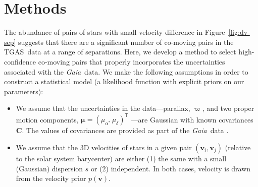 \documentclass[manuscript, letterpaper]{aastex6}
\newcommand{\project}[1]{\textsl{#1}}
\newcommand{\acronym}[1]{{\small{#1}}}
\newcommand{\gaia}{\project{Gaia}}
\newcommand{\figname}{Figure}
\newcommand{\tgas}{\acronym{TGAS}}
\newcommand{\transp}[1]{{#1}^{\!\mathsf{T}}}
\newcommand{\bs}[1]{\boldsymbol{#1}}
\newcommand{\propm}{\bs{\mu}}
\newcommand{\mat}[1]{\mathbf{#1}}
\renewcommand{\vec}[1]{\bs{#1}}
\begin{document}
\section{Methods} \label{sec:methods}

The abundance of pairs of stars with small velocity difference in
\figname~\ref{fig:dv-sep} suggests that there are a
significant number of co-moving pairs in the \tgas\ data at a range
of separations.
Here, we develop a method to select high-confidence co-moving
pairs that properly incorporates the uncertainties associated with the
\gaia\ data. We make the following assumptions in order to construct a
statistical model (a likelihood function with explicit priors on our
parameters):
\begin{itemize}
  \item We assume that the uncertainties in the data---parallax, $\varpi$, and
    two proper motion components, $\propm = \transp{(\mu_{\alpha^*}\, \mu_\delta)}$
    ---are Gaussian with known covariances
    $\mat{C}$. The values of covariances are provided as part of the \gaia\ data
    \citep{Lindegren:2012aa,Lindegren:2016aa}.
  \item We assume that the 3D velocities of stars in a given pair
    $(\vec{v}_i, \vec{v}_j)$ (relative to the solar system
    barycenter) are either (1) the same with a small (Gaussian) dispersion $s$
    or (2) independent.
    In both cases, velocity is drawn from
    the velocity prior $p(\vec{v})$.
\end{itemize}
\end{document}
